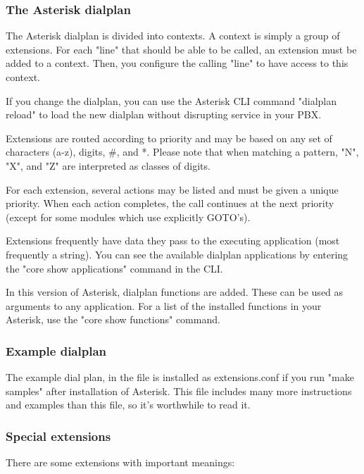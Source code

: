 \subsubsection{The Asterisk dialplan}

The Asterisk dialplan is divided into contexts. A context is simply a group
of extensions. For each "line" that should be able to be called, an extension
must be added to a context. Then, you configure the calling "line" to have
access to this context.

If you change the dialplan, you can use the Asterisk CLI command
"dialplan reload" to load the new dialplan without disrupting
service in your PBX.

Extensions are routed according to priority and may be based on any set
of characters (a-z), digits, \#, and *. Please note that when matching a
pattern, "N", "X", and "Z" are interpreted as classes of digits.

For each extension, several actions may be listed and must be given a unique
priority. When each action completes, the call continues at the next priority
(except for some modules which use explicitly GOTO's).

Extensions frequently have data they pass to the executing application
(most frequently a string).  You can see the available dialplan applications
by entering the "core show applications" command in the CLI.

In this version of Asterisk, dialplan functions are added. These can
be used as arguments to any application. For a list of the installed
functions in your Asterisk, use the "core show functions" command.

\subsubsection{Example dialplan}

The example dial plan, in the  file
is installed as extensions.conf if you run "make samples" after
installation of Asterisk. This file includes many more instructions
and examples than this file, so it's worthwhile to read it.
	
\subsubsection{Special extensions}

There are some extensions with important meanings:


